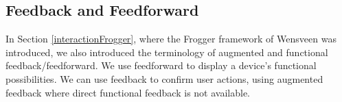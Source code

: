 %

%


\subsection{Feedback and Feedforward}
\label{section:feedbackAndFeedforward}

In Section \ref{interactionFrogger}, where the Frogger framework of Wensveen \cite{Wensveen2005} was introduced, we also introduced the terminology of augmented and functional feedback/feedforward. We use feedforward to display a device's functional possibilities. We can use feedback to confirm user actions, using augmented feedback where direct functional feedback is not available.

